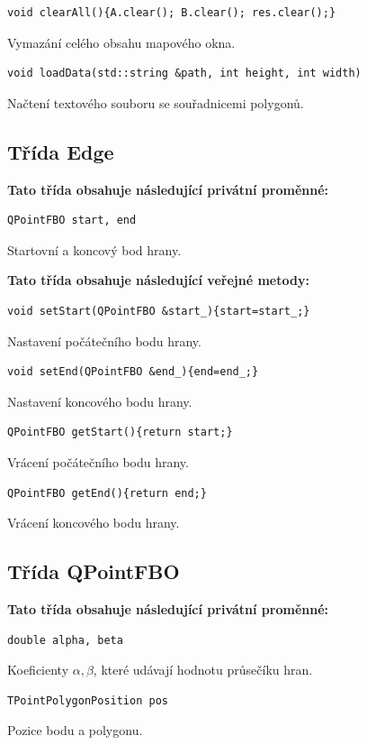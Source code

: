 \documentclass[a4paper, 12pt, oneside, titlepage]{article} %
\begin{document}
\begin{verbatim}
void clearAll(){A.clear(); B.clear(); res.clear();}
\end{verbatim} 
Vymazání celého obsahu mapového okna.

\begin{verbatim}
void loadData(std::string &path, int height, int width)
\end{verbatim} 
Načtení textového souboru se souřadnicemi polygonů.

\subsection{Třída Edge}
\textbf{Tato třída obsahuje následující privátní proměnné:}
\begin{verbatim}
QPointFBO start, end
\end{verbatim}
Startovní a koncový bod hrany.

\textbf{Tato třída obsahuje následující veřejné metody:}

\begin{verbatim}
void setStart(QPointFBO &start_){start=start_;}
\end{verbatim}
Nastavení počátečního bodu hrany.

\begin{verbatim}
void setEnd(QPointFBO &end_){end=end_;}
\end{verbatim}
Nastavení koncového bodu hrany.

\begin{verbatim}
QPointFBO getStart(){return start;}
\end{verbatim}
Vrácení počátečního bodu hrany.

\begin{verbatim}
QPointFBO getEnd(){return end;}
\end{verbatim}
Vrácení koncového bodu hrany.

\subsection{Třída QPointFBO}
\textbf{Tato třída obsahuje následující privátní proměnné:}
\begin{verbatim}
double alpha, beta
\end{verbatim}
Koeficienty $\alpha, \beta$, které udávají hodnotu průsečíku hran.

\begin{verbatim}
TPointPolygonPosition pos
\end{verbatim}
Pozice bodu a polygonu.
\end{document}
